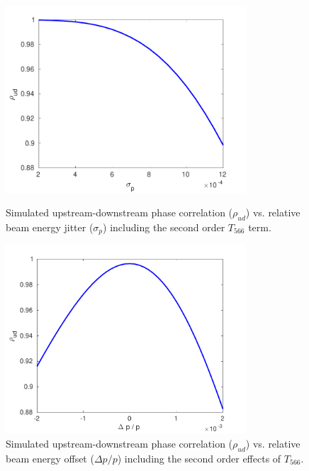 \begin{figure}
  \centering
  \includegraphics[width=0.8\textwidth]{Figures/propagation/maxCorrWithT566}
  \caption{Simulated upstream-downstream phase correlation (\(\rho_{ud}\)) vs. relative beam energy jitter (\(\sigma_p\)) including the second order \(T_{566}\) term.}
  \label{f:maxCorrWithT566}
  \centering
  \includegraphics[width=0.8\textwidth]{Figures/propagation/corrVsEnergyOffset}
  \caption{Simulated upstream-downstream phase correlation (\(\rho_{ud}\)) vs. relative beam energy offset (\(\Delta p/p\)) including the second order effects of \(T_{566}\).}
  \label{f:corrVsEnergyOffset}
\end{figure}

